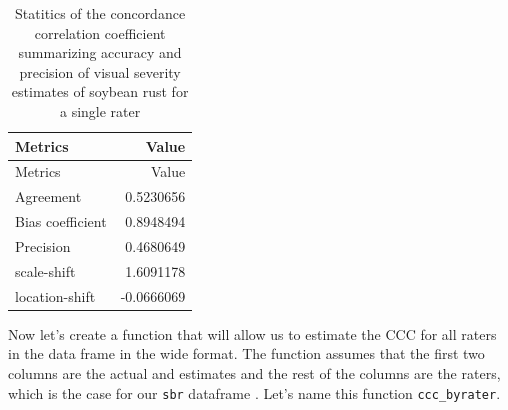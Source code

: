 \documentclass[
  letterpaper,
  DIV=11,
  numbers=noendperiod]{scrreprt}
\newenvironment{Shaded}{\begin{snugshade}}{\end{snugshade}}
\newcommand{\AttributeTok}[1]{\textcolor[rgb]{0.40,0.45,0.13}{#1}}
\newcommand{\ControlFlowTok}[1]{\textcolor[rgb]{0.00,0.23,0.31}{#1}}
\newcommand{\DecValTok}[1]{\textcolor[rgb]{0.68,0.00,0.00}{#1}}
\newcommand{\FunctionTok}[1]{\textcolor[rgb]{0.28,0.35,0.67}{#1}}
\newcommand{\NormalTok}[1]{\textcolor[rgb]{0.00,0.23,0.31}{#1}}
\newcommand{\OtherTok}[1]{\textcolor[rgb]{0.00,0.23,0.31}{#1}}
\newcommand{\SpecialCharTok}[1]{\textcolor[rgb]{0.37,0.37,0.37}{#1}}
\newcommand{\StringTok}[1]{\textcolor[rgb]{0.13,0.47,0.30}{#1}}
\begin{document}
\hypertarget{tbl-ccc}{}
\begin{longtable}[]{@{}lr@{}}
\caption{\label{tbl-ccc}Statitics of the concordance correlation
coefficient summarizing accuracy and precision of visual severity
estimates of soybean rust for a single rater}\tabularnewline
\toprule\noalign{}
Metrics & Value \\
\midrule\noalign{}
\endfirsthead
\toprule\noalign{}
Metrics & Value \\
\midrule\noalign{}
\endhead
\bottomrule\noalign{}
\endlastfoot
Agreement & 0.5230656 \\
Bias coefficient & 0.8948494 \\
Precision & 0.4680649 \\
scale-shift & 1.6091178 \\
location-shift & -0.0666069 \\
\end{longtable}

Now let's create a function that will allow us to estimate the CCC for
all raters in the data frame in the wide format. The function assumes
that the first two columns are the actual and estimates and the rest of
the columns are the raters, which is the case for our \texttt{sbr}
dataframe . Let's name this function \texttt{ccc\_byrater}.

\begin{Shaded}
\end{Shaded}
\end{document}
